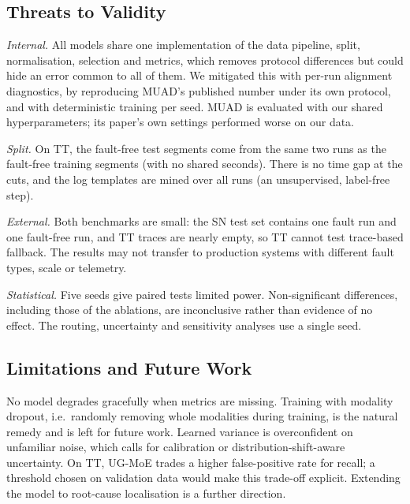 \documentclass[journal]{IEEEtran}
\newcommand{\ugmoe}{UG-MoE}
\begin{document}
\subsection{Threats to Validity}
\emph{Internal.} All models share one implementation of the data pipeline, split, normalisation, selection
and metrics, which removes protocol differences but could hide an error common to all of them. We
mitigated this with per-run alignment diagnostics, by reproducing MUAD's published number under its own
protocol, and with deterministic training per seed. MUAD is evaluated with our shared hyperparameters; its
paper's own settings performed worse on our data.

\emph{Split.} On TT, the fault-free test segments come from the same two runs as the fault-free training
segments (with no shared seconds). There is no time gap at the cuts, and the log templates are mined over
all runs (an unsupervised, label-free step).

\emph{External.} Both benchmarks are small: the SN test set contains one fault run and one fault-free run, and
TT traces are nearly empty, so TT cannot test trace-based fallback. The results may not transfer to
production systems with different fault types, scale or telemetry.

\emph{Statistical.} Five seeds give paired tests limited power. Non-significant differences, including those
of the ablations, are inconclusive rather than evidence of no effect. The routing, uncertainty and
sensitivity analyses use a single seed.

\subsection{Limitations and Future Work}
No model degrades gracefully when metrics are missing. Training with modality dropout, i.e.\ randomly
removing whole modalities during training, is the natural remedy and is left for future work. Learned
variance is overconfident on unfamiliar noise, which calls for calibration or distribution-shift-aware
uncertainty. On TT, \ugmoe{} trades a higher false-positive rate for recall; a threshold chosen on validation
data would make this trade-off explicit. Extending the model to root-cause localisation is a further
direction.

\end{document}
